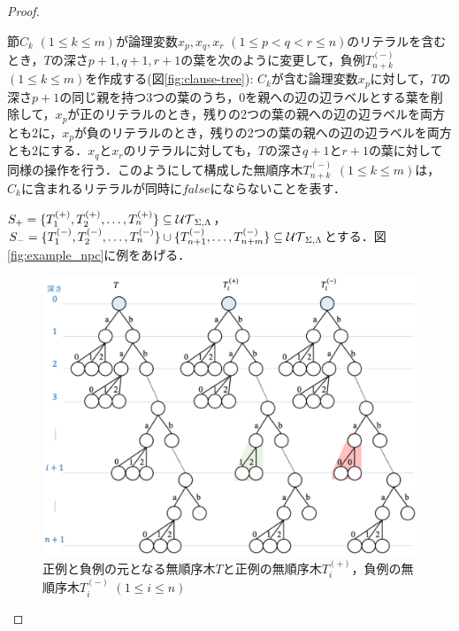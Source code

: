 \begin{proof}
\begin{enumerate}
節$C_k$ $(1\leq k\leq m)$が論理変数$x_p,x_q,x_r$ $(1\leq p < q < r \leq n)$のリテラルを含むとき，$T$の深さ$p+1,q+1,r+1$の葉を次のように変更して，負例$T_{n+k}^{(-)}$ $(1\leq k\leq m)$を作成する(図\ref{fig:clause-tree}): $C_k$が含む論理変数$x_p$に対して，$T$の深さ$p+1$の同じ親を持つ3つの葉のうち，$0$を親への辺の辺ラベルとする葉を削除して，$x_p$が正のリテラルのとき，残りの2つの葉の親への辺の辺ラベルを両方とも$2$に，$x_p$が負のリテラルのとき，残りの2つの葉の親への辺の辺ラベルを両方とも$2$にする．$x_q$と$x_r$のリテラルに対しても，$T$の深さ$q+1$と$r+1$の葉に対して同様の操作を行う．このようにして構成した無順序木$T_{n+k}^{(-)}$ $(1\leq k\leq m)$は，$C_{k}$に含まれるリテラルが同時に$false$にならないことを表す．
\end{enumerate}
$S_{+}=\{T_1^{(+)},T_2^{(+)},\ldots,T_n^{(+)}\}\subseteq {\cal UT}_{\Sigma,\Lambda}$，$S_{-}=\{T_1^{(-)},T_2^{(-)},\ldots,T_{n}^{(-)}\}\cup\{T_{n+1}^{(-)},\ldots,T_{n+m}^{(-)}\}\subseteq {\cal UT}_{\Sigma,\Lambda}$とする．図\ref{fig:example_npc}に例をあげる．

\medskip

\begin{figure}[tb]
  \centering
  \includegraphics[scale=0.5]{fig/sample-tree.eps}
  \caption{正例と負例の元となる無順序木$T$と正例の無順序木$T_{i}^{(+)}$，負例の無順序木$T_{i}^{(-)}$ $(1\leq i\leq n)$}\label{fig:sample-tree}
\end{figure}


\end{proof}

